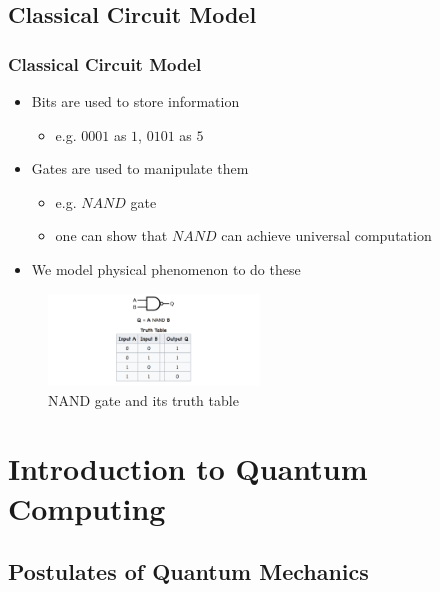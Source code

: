 \documentclass{beamer}
\newcommand{\<}{\langle}
\renewcommand{\>}{\rangle}
\begin{document}
\subsection{Classical Circuit Model}
\begin{frame}
\frametitle{Classical Circuit Model}

\begin{itemize}
    \item Bits are used to store information
        \begin{itemize}
            \item e.g. $0001$ as $1$, $0101$ as $5$
        \end{itemize}
    \item Gates are used to manipulate them
        \begin{itemize}
            \item e.g. $NAND$ gate
            \item one can show that $NAND$ can achieve universal computation
        \end{itemize}
    \item We model physical phenomenon to do these
\end{itemize}

\begin{figure}
    \centering
    \includegraphics[width=0.5\textwidth]{nand.png}
    \caption{NAND gate and its truth table}
    \label{fig:nand}
\end{figure}

\end{frame}


\section{Introduction to Quantum Computing}

\subsection{Postulates of Quantum Mechanics}
\end{document}
